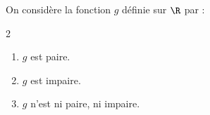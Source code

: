 \begin{exo}{}
	On considère la fonction $g$ définie sur $\R$ par : 
	\vspace*{-2mm}\begin{multicols}{2}
	\begin{enumerate}
		\item $g$ est paire.
		\item $g$ est impaire.
		\item $g$ n'est ni paire, ni impaire.
	\end{enumerate}
	\end{multicols}\vspace{-3mm}
\end{exo}
